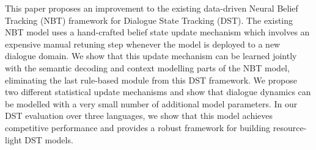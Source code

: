 This paper proposes an improvement to the existing data-driven Neural Belief Tracking (NBT) framework for Dialogue State Tracking (DST). The existing NBT model uses a hand-crafted belief state update mechanism which involves an expensive manual retuning step whenever the model is deployed to a new dialogue domain. We show that this update mechanism can be learned jointly with the semantic decoding and context modelling parts of the NBT model, eliminating the last rule-based module from this DST framework. We propose two different statistical update mechanisms and show that dialogue dynamics can be modelled with a very small number of additional model parameters. In our DST evaluation over three languages, we show that this model achieves competitive performance and provides a robust framework for building resource-light DST models.
